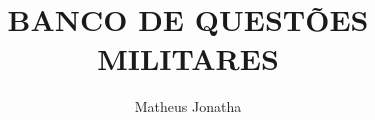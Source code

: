 \documentclass{scrartcl} %
\title{BANCO DE QUESTÕES MILITARES}
\author{Matheus Jonatha}
\begin{document}
\maketitle
\begin{multicols}{2}



\end{multicols}
\end{document}
